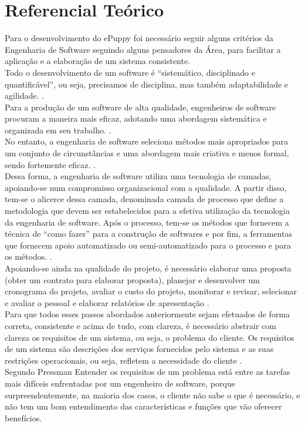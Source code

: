 \chapter{Referencial Teórico}
Para o desenvolvimento do ePuppy foi necessário seguir alguns critérios da Engenharia de Software seguindo alguns pensadores da Área, para facilitar a aplicação e a elaboração de um sistema consistente.
\\
\indent
Todo o desenvolvimento de um software é “sistemático, disciplinado e quantificável”, ou seja, precisamos de disciplina, mas também adaptabilidade e agilidade. \cite{Pressman2006}.
\\
\indent
Para a produção de um software de alta qualidade, engenheiros de software procuram a maneira mais eficaz, adotando uma abordagem sistemática e organizada em seu trabalho. \cite{Sommerville2011}.
\\
\indent
No entanto, a engenharia de software seleciona métodos mais apropriados para um conjunto de circunstâncias e uma abordagem mais criativa e menos formal, sendo fortemente eficaz. \cite{Sommerville2011}.
\\
\indent
Dessa forma, a engenharia de software utiliza uma tecnologia de camadas, apoiando-se num compromisso organizacional com a qualidade. A partir disso, tem-se o alicerce dessa camada, denominada camada de processo que define a metodologia que devem ser estabelecidos para a efetiva utilização da tecnologia da engenharia de software. Após o processo, tem-se os métodos que fornecem a técnica de “como fazer” para a construção de softwares e por fim, a ferramentas que fornecem apoio automatizado ou semi-automatizado para o processo e para os métodos. \cite{Pressman2006}.
\\
\indent
Apoiando-se ainda na qualidade do projeto, é necessário elaborar uma proposta (obter um contrato para elaborar proposta), planejar e desenvolver um cronograma do projeto, avaliar o custo do projeto, monitorar e revisar, selecionar e avaliar o pessoal e elaborar relatórios de apresentação \cite{Sommerville2011}.
\\
\indent
Para que todos esses passos abordados anteriormente sejam efetuados de forma correta, consistente e acima de tudo, com clareza, é necessário abstrair com clareza os requisitos de um sistema, ou seja, o problema do cliente. Os requisitos de um sistema são descrições dos serviços fornecidos pelo sistema e as suas restrições operacionais, ou seja, refletem a necessidade do cliente \cite{Sommerville2011}.
\\
\indent
Segundo Pressman \cite{Pressman2006} Entender os requisitos de um problema está entre as tarefas mais difíceis enfrentadas por um engenheiro de software, porque surpreendentemente, na maioria dos casos, o cliente não sabe o que é necessário, e não tem um bom entendimento das características e funções que vão oferecer benefícios.
